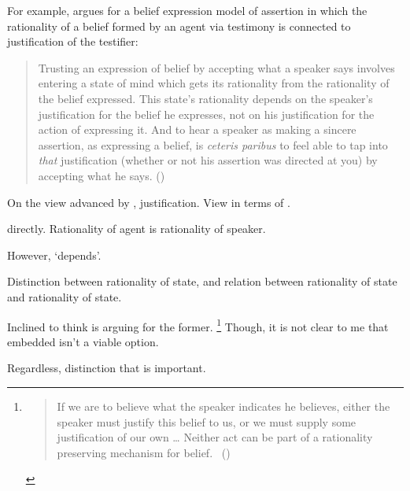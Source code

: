 \begin{note}
  For example, \citeauthor{Owens:2006tw} argues for a belief expression model of assertion in which the rationality of a belief formed by an agent via testimony is connected to justification of the testifier:

  \begin{quote}
    Trusting an expression of belief by accepting what a speaker says involves entering a state of mind which gets its rationality from the rationality of the belief expressed.
    This state's rationality depends on the speaker's justification for the belief he expresses, not on his justification for the action of expressing it.
    And to hear a speaker as making a sincere assertion, as expressing a belief, is \emph{ceteris paribus} to feel able to tap into \emph{that} justification (whether or not his assertion was directed at you) by accepting what he says.%
    \mbox{}\hfill\mbox{(\citeyear[123]{Owens:2006tw})}
  \end{quote}

  On the view advanced by \citeauthor{Owens:2006tw}, justification.
  View in terms of \support{}.

  \support{} directly.
  Rationality of agent is rationality of speaker.

  However, `depends'.

  Distinction between rationality of state, and relation between rationality of state and rationality of state.

  Inclined to think \citeauthor{Owens:2006tw} is arguing for the former.%
  \footnote{
    \begin{quote}
      If we are to believe what the speaker indicates he believes, either the speaker must justify this belief to us, or we must supply some justification of our own
      \dots
      Neither act can be part of a rationality preserving mechanism for belief.%
      \mbox{ }\hfill\mbox{(\citeyear[123--124]{Owens:2006tw})}
    \end{quote}
  }
  Though, it is not clear to me that embedded isn't a viable option.

  Regardless, distinction that is important.
\end{note}


